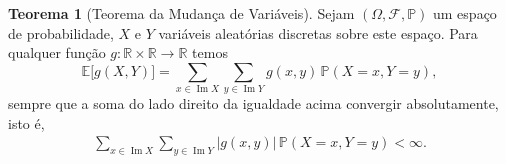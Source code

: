 \documentclass[12pt,portuguese]{article}
\theoremstyle{definition}
\newtheorem{theorem}{Teorema}
\begin{document}
\begin{theorem}[Teorema da Mudança de Variáveis]\label{thm:esperanca-g-xy}
Sejam $(\Omega,\mathcal{F},\mathbb{P})$ um espaço de probabilidade, $X$ e $Y$ variáveis aleatórias
discretas sobre este espaço. Para qualquer função $g:\mathbb{R}\times\mathbb{R}\to\mathbb{R}$ temos
\begin{equation}\label{eq:esperanca-g-xy}
  \mathbb{E}\bigl[g(X, Y)\bigr] = \sum_{x \in \operatorname{Im} X} \sum_{y \in \operatorname{Im} Y} g(x, y)\, \mathbb{P}(X = x, Y = y),
\end{equation}
sempre que a soma do lado direito da igualdade acima convergir absolutamente, isto é,
\begin{align*}
\sum_{x \in \operatorname{Im} X} \sum_{y \in \operatorname{Im} Y}  |g(x,y)|\,\mathbb{P}(X=x,Y=y)<\infty.
\end{align*}
\end{theorem}
\end{document}
